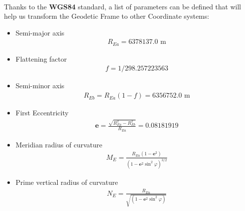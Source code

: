 \paragraph{}Thanks to the \textbf{WGS84} standard, a list of parameters can be defined that will help us transform the Geodetic Frame to other Coordinate systems:

\begin{itemize}
\item{Semi-major axis\\
\begin{align*}
& R_{Ea} = 6378137.0 \text{ m}
\end{align*}}
\item{Flattening factor\\
\begin{align*}
& f = 1/298.257223563 
\end{align*}}
\item{Semi-minor axis \\
\begin{align*}
& R_{Eb} = R_{Ea}(1-f) = 6356752.0 \text{ m}
\end{align*}}
\item{First Eccentricity \\
\begin{align*}
& \textbf{e} = \frac{\sqrt{R_{Ea}^2-R_{Eb}^2}}{R_{Ea}} = 0.08181919
\end{align*}}
\item{Meridian radius of curvature \\
\begin{align*}
& M_{E} = \frac{R_{Ea}(1-\textbf{e}^2)}{(1-\textbf{e}^2\sin^2\varphi)^{3/2}} 
\end{align*}}
\item{Prime vertical radius of curvature \\
\begin{align*}
& N_{E} = \frac{R_{Ea}}{\sqrt{(1-\textbf{e}^2\sin^2\varphi)}}
\end{align*}}
\end{itemize}
